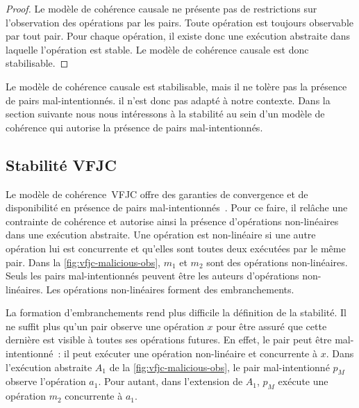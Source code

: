 \begin{proof}
Le modèle de cohérence causale ne présente pas de restrictions sur l'observation des opérations par les pairs.
Toute opération est toujours observable par tout pair.
Pour chaque opération, il existe donc une exécution abstraite dans laquelle l'opération est stable.
Le modèle de cohérence causale est donc stabilisable.
\end{proof}

Le modèle de cohérence causale est stabilisable, mais il ne tolère pas la présence de pairs mal-intentionnés.
il n'est donc pas adapté à notre contexte.
Dans la section suivante nous nous intéressons à la stabilité au sein d'un modèle de cohérence qui autorise la présence de pairs mal-intentionnés.


\subsection{Stabilité \acl{VFJC}}\label{subsec:vfjcs}

Le modèle de cohérence~\acf{VFJC} offre des garanties de convergence et de disponibilité en présence de pairs mal-intentionnés~\autocite{mahajan_2011_cac}.
Pour ce faire, il relâche une contrainte de cohérence et autorise ainsi la présence d'opérations non-linéaires dans une exécution abstraite.
Une opération est non-linéaire si une autre opération lui est concurrente et qu'elles sont toutes deux exécutées par le même pair.
Dans la \autoref{fig:vfjc-malicious-obs}, $m_1$ et $m_2$ sont des opérations non-linéaires.
Seuls les pairs mal-intentionnés peuvent être les auteurs d'opérations non-linéaires.
Les opérations non-linéaires forment des embranchements.

La formation d'embranchements rend plus difficile la définition de la stabilité.
Il ne suffit plus qu'un pair observe une opération $x$ pour être assuré que cette dernière est visible à toutes ses opérations futures.
En effet, le pair peut être mal-intentionné~: il peut exécuter une opération non-linéaire et concurrente à $x$.
Dans l'exécution abstraite $A_1$ de la \autoref{fig:vfjc-malicious-obs}, le pair mal-intentionné $p_M$ observe l'opération $a_1$.
Pour autant, dans l'extension de $A_1$, $p_M$ exécute une opération $m_2$ concurrente à $a_1$.

